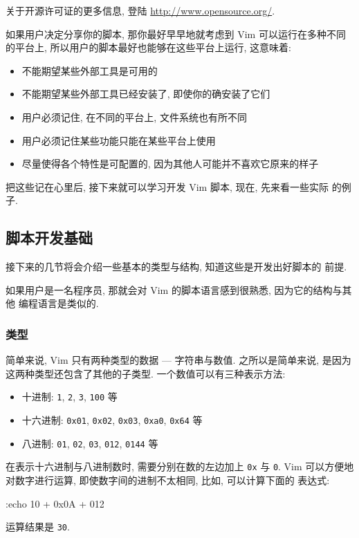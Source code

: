 \begin{warning}
    关于开源许可证的更多信息, 登陆 \url{http://www.opensource.org/}.
\end{warning}

如果用户决定分享你的脚本, 那你最好早早地就考虑到 Vim 可以运行在多种不同的平台上,
所以用户的脚本最好也能够在这些平台上运行, 这意味着:
\begin{itemize}
    \item 不能期望某些外部工具是可用的
    \item 不能期望某些外部工具已经安装了, 即使你的确安装了它们
    \item 用户必须记住, 在不同的平台上, 文件系统也有所不同
    \item 用户必须记住某些功能只能在某些平台上使用
    \item 尽量使得各个特性是可配置的, 因为其他人可能并不喜欢它原来的样子
\end{itemize}

把这些记在心里后, 接下来就可以学习开发 Vim 脚本, 现在, 先来看一些实际
的例子.

\subsection{脚本开发基础}
\label{subsec:script_writing_basics}

接下来的几节将会介绍一些基本的类型与结构, 知道这些是开发出好脚本的
前提.

如果用户是一名程序员, 那就会对 Vim 的脚本语言感到很熟悉, 因为它的结构与其他
编程语言是类似的.

\subsubsection{类型}
\label{subsubsec:types}

简单来说, Vim 只有两种类型的数据 --- 字符串与数值. 之所以是简单来说, 是因为
这两种类型还包含了其他的子类型. 一个数值可以有三种表示方法:
\begin{itemize}
    \item 十进制: \texttt{1}, \texttt{2}, \texttt{3}, \texttt{100} 等
    \item 十六进制: \texttt{0x01}, \texttt{0x02}, \texttt{0x03}, \texttt{0xa0},
        \texttt{0x64} 等
    \item 八进制: \texttt{01}, \texttt{02}, \texttt{03}, \texttt{012},
        \texttt{0144} 等
\end{itemize}

在表示十六进制与八进制数时, 需要分别在数的左边加上 \texttt{0x} 与 \texttt{0}.
Vim 可以方便地对数字进行运算, 即使数字间的进制不太相同, 比如, 可以计算下面的
表达式:
\begin{vimcode}
:echo 10 + 0x0A + 012
\end{vimcode}
运算结果是 \texttt{30}.

